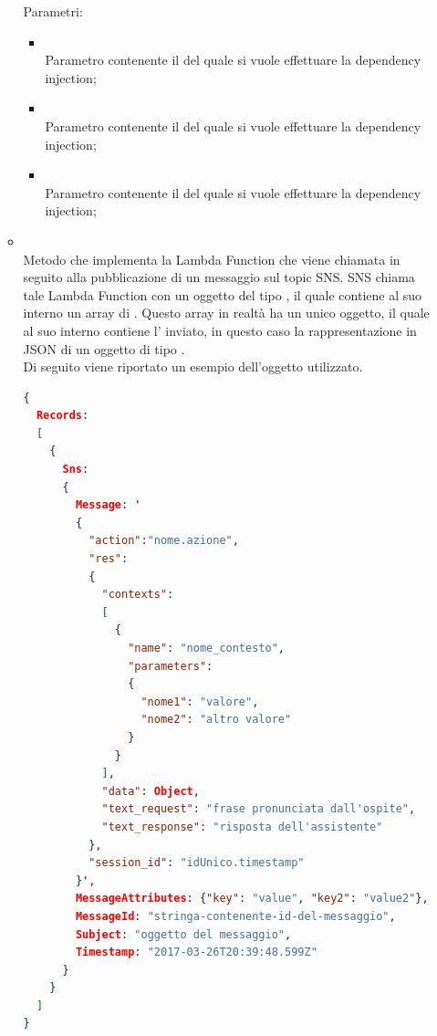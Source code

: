\begin{itemize}
\begin{itemize}
		Parametri:
		\begin{itemize}
			\item {} \\
			Parametro contenente il  del quale si vuole effettuare la dependency injection;
			\item {} \\
			Parametro contenente il  del quale si vuole effettuare la dependency injection;
			\item {} \\
			Parametro contenente il  del quale si vuole effettuare la dependency injection;
		\end{itemize}
		\item[]  \\		Metodo che implementa la Lambda Function che viene chiamata in seguito alla pubblicazione di un messaggio sul topic SNS. SNS chiama tale Lambda Function con un oggetto del tipo , il quale contiene al suo interno un array di . Questo array in realtà ha un unico oggetto, il quale al suo interno contiene l' inviato, in questo caso la rappresentazione in JSON di un oggetto di tipo . \\
Di seguito viene riportato un esempio dell'oggetto utilizzato.
\begin{lstlisting}[language=json,firstnumber=1]
{
  Records:
  [
    {
      Sns:
      {
        Message: '
        {
          "action":"nome.azione",
          "res":
          {
            "contexts":
            [
              {
                "name": "nome_contesto",
                "parameters":
                {
                  "nome1": "valore",
                  "nome2": "altro valore"
                }
              }
            ],
            "data": Object,
            "text_request": "frase pronunciata dall'ospite",
            "text_response": "risposta dell'assistente"
          },
          "session_id": "idUnico.timestamp"
        }',
        MessageAttributes: {"key": "value", "key2": "value2"},
        MessageId: "stringa-contenente-id-del-messaggio",
        Subject: "oggetto del messaggio",
        Timestamp: "2017-03-26T20:39:48.599Z"
      }
    }
  ]
}
\end{lstlisting}

\end{itemize}
\end{itemize}

